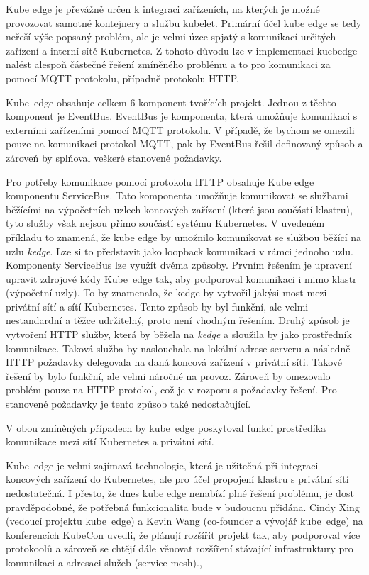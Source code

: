Kube edge je převážně určen k integraci zařízeních, na kterých je možné provozovat samotné kontejnery a službu kubelet. Primární účel kube edge se tedy neřeší výše popsaný problém, ale je velmi úzce spjatý s komunikací určitých zařízení a interní sítě Kubernetes. Z tohoto důvodu lze v implementaci kuebedge nalést alespoň částečné řešení zmíněného problému a to pro komunikaci za pomocí MQTT protokolu, případně protokolu HTTP.

Kube~edge obsahuje celkem 6 komponent tvořících projekt. Jednou z těchto komponent je EventBus. EventBus je komponenta, která umožňuje komunikaci s externími zařízeními pomocí MQTT protokolu. V případě, že bychom se omezili pouze na komunikaci protokol MQTT, pak by EventBus řešil definovaný způsob a zároveň by splňoval veškeré stanovené požadavky.

Pro potřeby komunikace pomocí protokolu HTTP obsahuje Kube edge komponentu ServiceBus. Tato komponenta umožňuje komunikovat se službami běžícími na výpočetních uzlech koncových zařízení (které jsou součástí klastru), tyto služby však nejsou přímo součástí systému Kubernetes. V uvedeném příkladu to znamená, že kube edge by umožnilo komunikovat se službou běžící na uzlu \textit{kedge}. Lze si to představit jako loopback komunikaci v rámci jednoho uzlu. Komponenty ServiceBus lze využít dvěma způsoby. Prvním řešením je upravení upravit zdrojové kódy Kube~edge tak, aby podporoval komunikaci i mimo klastr (výpočetní uzly). To by znamenalo, že kedge by vytvořil jakýsi most mezi privátní sítí a sítí Kubernetes. Tento způsob by byl funkční, ale velmi nestandardní a těžce udržitelný, proto není vhodným řešením. Druhý způsob je vytvoření HTTP služby, která by běžela na \textit{kedge} a sloužila by jako prostředník komunikace. Taková služba by naslouchala na lokální adrese serveru a následně HTTP požadavky delegovala na daná koncová zařízení v privátní síti. Takové řešení by bylo funkční, ale velmi náročné na provoz. Zároveň by omezovalo problém pouze na HTTP protokol, což je v rozporu s požadavky řešení. Pro stanovené požadavky je tento způsob také nedostačující. \cite{ttlv_2021_servicebusgo}

V obou zmíněných případech by kube~edge poskytoval funkci prostředíka komunikace mezi sítí Kubernetes a privátní sítí.

Kube~edge je velmi zajímavá technologie, která je užitečná při integraci koncových zařízení do Kubernetes, ale pro účel propojení klastru s privátní sítí nedostatečná. I přesto, že dnes kube edge nenabízí plné řešení problému, je dost pravděpodobné, že potřebná funkcionalita bude v budoucnu přidána. Cindy Xing (vedoucí projektu kube~edge) a Kevin Wang (co-founder a vývojář kube~edge) na konferencích KubeCon uvedli, že plánují rozšířit projekt tak, aby podporoval více protokoolů a zároveň se chtějí dále věnovat rozšíření stávající infrastruktury pro komunikaci a adresaci služeb (service mesh).\cite{cncfcloudnativecomputingfoundation_2019_intro},\cite{cncfcloudnativecomputingfoundation_2022_intro}
